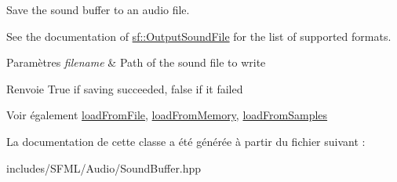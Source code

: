 Save the sound buffer to an audio file. 

See the documentation of \hyperlink{classsf_1_1OutputSoundFile}{sf\+::\+Output\+Sound\+File} for the list of supported formats.


\begin{DoxyParams}{Paramètres}
{\em filename} & Path of the sound file to write\\
\hline
\end{DoxyParams}
\begin{DoxyReturn}{Renvoie}
True if saving succeeded, false if it failed
\end{DoxyReturn}
\begin{DoxySeeAlso}{Voir également}
\hyperlink{classsf_1_1SoundBuffer_a2be6a8025c97eb622a7dff6cf2594394}{load\+From\+File}, \hyperlink{classsf_1_1SoundBuffer_af8cfa5599739a7edae69c5cba273d33f}{load\+From\+Memory}, \hyperlink{classsf_1_1SoundBuffer_a42d51ce4bb3b60c7ea06f63c273fd063}{load\+From\+Samples} 
\end{DoxySeeAlso}


La documentation de cette classe a été générée à partir du fichier suivant \+:\begin{DoxyCompactItemize}
\item 
includes/\+S\+F\+M\+L/\+Audio/Sound\+Buffer.\+hpp\end{DoxyCompactItemize}
